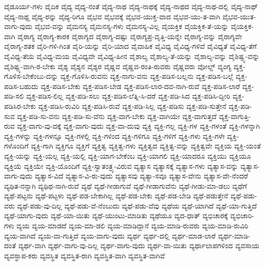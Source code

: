 {ವೈಡೂರ್ಯ-ಗಳು
ವೈದಿಕ
ವೈದ್ಯ
ವೈದ್ಯ-ನಂತೆ
ವೈದ್ಯ-ನಾಥ
ವೈದ್ಯ-ನಾಥಕ್ಕೆ
ವೈದ್ಯ-ನಾಥದ
ವೈದ್ಯ-ನಾಥ-ದಲ್ಲಿ
ವೈದ್ಯ-ನಾಥ್
ವೈದ್ಯ-ನಾಥ್ದ
ವೈದ್ಯ-ರನ್ನು
ವೈದ್ಯ-ರಿಗೂ
ವೈಭವ
ವೈಭವಕ್ಕೆ
ವೈಭವ-ಯುಕ್ತ-ವಾದ
ವೈಭವ-ಯು-ತ-ವಾಗಿ
ವೈಭವ-ಯುತ-ವಾಗು-ವುದು
ವೈಭವ-ವನ್ನು
ವೈಮನಸ್ಯ
ವೈಮನಸ್ಯ-ಗಳು
ವೈಮನಸ್ಯ-ವಿಲ್ಲ
ವೈಯಕ್ತಿಕ
ವೈಯಕ್ತಿಕ-ತೆ-ಯನ್ನು
ವೈಯಕ್ತಿಕ-ವಾಗಿ
ವೈರಾಗ್ಯ
ವೈರಾಗ್ಯ-ಕಾರಕ
ವೈರಾಗ್ಯದ
ವೈರಾಗ್ಯ-ದಷ್ಟು
ವೈರಾಗ್ಯಪ್ರ-ವೃತ್ತಿ-ಯನ್ನೇ
ವೈರಾಗ್ಯ-ವನ್ನು
ವೈರಾಗ್ಯವೇ
ವೈರಾಗ್ಯ-ಶತಕ
ವೈರಿ-ಗಳಿ-ಗಿಂತ
ವೈರಿ-ಯನ್ನು
ವೈರಿ-ಯಾದ
ವೈವಾಹಿಕ
ವೈವಿಧ್ಯ
ವೈವಿಧ್ಯ-ಗಳಿವೆ
ವೈವಿಧ್ಯತೆ
ವೈವಿಧ್ಯ-ತೆಗೆ
ವೈವಿಧ್ಯ-ತೆಯ
ವೈವಿಧ್ಯ-ಮಯ
ವೈವಿಧ್ಯವೇ
ವೈವಿಧ್ಯ-ಹೀನ
ವೈಶಾಲ್ಯ
ವೈಶಾಲ್ಯ-ತೆ-ಯನ್ನು
ವೈಶಾಲ್ಯ-ವನ್ನು
ವೈಶಿಷ್ಟ್ಯ-ವನ್ನು
ವೈಶಿಷ್ಟ್ಯ-ವಾಗಿ-ರ-ಬೇಕು
ವೈಶ್ಯ
ವೈಶ್ಯನ
ವೈಶ್ಯರ
ವೈಷ್ಣವ
ವೈಷ್ಣವ-ರಂತಿ-ರುವರು
ವೈಷ್ಣವರು
ವೋಲ್ಡ್
ವ್ಯಂಗ್ಯ
ವ್ಯಕ್ತ-ಗೊಳಿಸ-ಬೇಕೆಂಬು-ದನ್ನು
ವ್ಯಕ್ತ-ಗೊಳಿಸಿ-ರುವನು
ವ್ಯಕ್ತ-ನಾಗು-ವನು
ವ್ಯಕ್ತ-ಪಡಿಸ-ಬಲ್ಲನು
ವ್ಯಕ್ತ-ಪಡಿಸ-ಬಲ್ಲೆ
ವ್ಯಕ್ತ-ಪಡಿಸ-ಬಹುದು
ವ್ಯಕ್ತ-ಪಡಿಸ-ಬೇಕು
ವ್ಯಕ್ತ-ಪಡಿಸ-ಬೇಡ
ವ್ಯಕ್ತ-ಪಡಿಸ-ಲಾರ-ದವ-ನಾಗಿ-ರುವೆ
ವ್ಯಕ್ತ-ಪಡಿಸ-ಲಾರೆ
ವ್ಯಕ್ತ-ಪಡಿ-ಸಲಿ
ವ್ಯಕ್ತ-ಪಡಿಸ-ಲಿಲ್ಲ
ವ್ಯಕ್ತ-ಪಡಿ-ಸಲು
ವ್ಯಕ್ತ-ಪಡಿಸ-ಲೆತ್ನಿ-ಸಿ-ದರೆ
ವ್ಯಕ್ತ-ಪಡಿ-ಸಿದ
ವ್ಯಕ್ತ-ಪಡಿಸಿ-ದ್ದೀರಿ
ವ್ಯಕ್ತ-ಪಡಿಸಿರ-ಬೇಕು
ವ್ಯಕ್ತ-ಪಡಿಸಿ-ರುವಿರಿ
ವ್ಯಕ್ತ-ಪಡಿಸಿ-ರುವೆ
ವ್ಯಕ್ತ-ಪಡಿ-ಸಿಲ್ಲ
ವ್ಯಕ್ತ-ಪಡಿಸು
ವ್ಯಕ್ತ-ಪಡಿ-ಸುತ್ತೇನೆ
ವ್ಯಕ್ತ-ಪಡಿ-ಸುವ
ವ್ಯಕ್ತ-ಪಡಿ-ಸು-ವನು
ವ್ಯಕ್ತ-ಪಡಿ-ಸು-ವೆನು
ವ್ಯಕ್ತ-ವಾಗ-ಬೇಕು
ವ್ಯಕ್ತ-ವಾಗಿಯೇ
ವ್ಯಕ್ತ-ವಾಗುತ್ತದೆ
ವ್ಯಕ್ತ-ವಾಗುತ್ತಿ-ರುವ
ವ್ಯಕ್ತ-ವಾಗು-ವು-ದಕ್ಕೆ
ವ್ಯಕ್ತ-ವಾಗು-ವುದು
ವ್ಯಕ್ತ-ವಾ-ದುವು
ವ್ಯಕ್ತಿ
ವ್ಯಕ್ತಿ-ಗಲ್ಲ
ವ್ಯಕ್ತಿ-ಗಳ
ವ್ಯಕ್ತಿ-ಗಳಂತೆ
ವ್ಯಕ್ತಿ-ಗಳನ್ನಾಗಿ
ವ್ಯಕ್ತಿ-ಗಳನ್ನು
ವ್ಯಕ್ತಿ-ಗಳನ್ನೂ
ವ್ಯಕ್ತಿ-ಗಳಲ್ಲಿ
ವ್ಯಕ್ತಿ-ಗಳಿಂದ
ವ್ಯಕ್ತಿ-ಗಳಿಗೂ
ವ್ಯಕ್ತಿ-ಗಳಿಗೆ
ವ್ಯಕ್ತಿ-ಗಳು
ವ್ಯಕ್ತಿ-ಗಳೇ
ವ್ಯಕ್ತಿ-ಗಳೊಂದಿಗೆ
ವ್ಯಕ್ತಿ-ಗಾಗಿ
ವ್ಯಕ್ತಿಗೂ
ವ್ಯಕ್ತಿಗೆ
ವ್ಯಕ್ತಿತ್ವ
ವ್ಯಕ್ತಿತ್ವ-ಗಳು
ವ್ಯಕ್ತಿತ್ವದ
ವ್ಯಕ್ತಿತ್ವ-ವನ್ನು
ವ್ಯಕ್ತಿತ್ವವೇ
ವ್ಯಕ್ತಿಯ
ವ್ಯಕ್ತಿ-ಯಂತೆ
ವ್ಯಕ್ತಿ-ಯನ್ನು
ವ್ಯಕ್ತಿ-ಯಲ್ಲ
ವ್ಯಕ್ತಿ-ಯಲ್ಲಿ
ವ್ಯಕ್ತಿ-ಯಾಗ-ಬೇಕೆಂಬ
ವ್ಯಕ್ತಿ-ಯಾಗಲಿ
ವ್ಯಕ್ತಿ-ಯಾದರೂ
ವ್ಯಕ್ತಿಯು
ವ್ಯಕ್ತಿಯೂ
ವ್ಯಕ್ತಿಯೆ
ವ್ಯಕ್ತಿಯೇ
ವ್ಯಕ್ತಿ-ಯೊಂದಿಗೆ
ವ್ಯಕ್ತಿ-ಸ್ವಾತಂತ್ರ್ಯ-ವಿರುವ
ವ್ಯತ್ಯಾಸ
ವ್ಯತ್ಯಾಸಕ್ಕೆ
ವ್ಯತ್ಯಾಸ-ಗಳು
ವ್ಯತ್ಯಾಸ-ವನ್ನು
ವ್ಯತ್ಯಾಸ-ವಾಗು-ವುದು
ವ್ಯತ್ಯಾಸ-ವಿದೆ
ವ್ಯತ್ಯಾಸ-ವಿ-ರು-ವುದು
ವ್ಯತ್ಯಾಸವು
ವ್ಯತ್ಯಾ-ಸವೂ
ವ್ಯತ್ಯಾಸ-ವೇನು
ವ್ಯತ್ಯಾಸ-ವೇ-ನೆಂದರೆ
ವ್ಯಥಿತ-ನನ್ನಾಗಿ
ವ್ಯಥಿಥ-ನಾಗಿ-ರುವೆ
ವ್ಯಥೆ
ವ್ಯಥೆ-ಗೀಡಾಗುವೆ
ವ್ಯಥೆ-ಗೀಡಾಗುವೆನು
ವ್ಯಥೆ-ಗೀಡು-ಮಾ-ಡಲು
ವ್ಯಥೆಗೆ
ವ್ಯಥೆ-ಪಟ್ಟನು
ವ್ಯಥೆ-ಪಟ್ಟಳು
ವ್ಯಥೆ-ಪಡ-ಬೇಕಾಗಿಲ್ಲ
ವ್ಯಥೆ-ಪಡ-ಬೇಕು
ವ್ಯಥೆ-ಪಡ-ಬೇಡಿ
ವ್ಯಥೆ-ಪಡುತ್ತೇನೆ
ವ್ಯಥೆ-ಪಡು-ವರು
ವ್ಯಥೆ-ಪಡು-ವು-ದಿಲ್ಲ
ವ್ಯಥೆ-ಪಡು-ವೆ-ನೆಂಬುದು
ವ್ಯಥೆ-ಪಡು-ವೆವು
ವ್ಯಥೆಯ
ವ್ಯಥೆ-ಯಾಗಿದೆ
ವ್ಯಥೆ-ಯಾ-ಗುತ್ತಿದೆ
ವ್ಯಥೆ-ಯಾಗು-ವುದು
ವ್ಯಥೆ-ಯಾ-ಯಿತು
ವ್ಯಥೆ-ಯುಂಟು-ಮಾಡಿತು
ವ್ಯಥೆಯೂ
ವ್ಯದ-ಧಾತ್
ವ್ಯಭಿಚಾರಕ್ಕೆ
ವ್ಯಭಿಚಾರಿ-ಗಳು
ವ್ಯಯ
ವ್ಯಯ-ಮಾಡದೆ
ವ್ಯಯ-ಮಾ-ಡಲಿ
ವ್ಯಯ-ಮಾಡಿದ್ದಾನೆ
ವ್ಯಯ-ಮಾಡಿ-ರುವರು
ವ್ಯಯ-ಮಾಡಿ-ರುವಿರಿ
ವ್ಯಯ-ವಾಗಿದೆ
ವ್ಯಯ-ವಾ-ಗುತ್ತಿದೆ
ವ್ಯಯ-ವಾಗು-ವುದು
ವ್ಯರ್ಥ
ವ್ಯರ್ಥ-ದಲ್ಲಿ
ವ್ಯರ್ಥ-ಮಾಡ-ಲಾರೆ
ವ್ಯರ್ಥ-ಮಾಡಿ-ದಂತೆ
ವ್ಯರ್ಥ-ವಾಗಿ
ವ್ಯರ್ಥ-ವಾಗು-ವು-ದಿಲ್ಲ
ವ್ಯರ್ಥ-ವಾಗು-ವುದು
ವ್ಯರ್ಥ-ವಾ-ಯಿತು
ವ್ಯರ್ಥಾಲಾಪಗಳಿಂದ
ವ್ಯವಸಾಯ
ವ್ಯವಸ್ಥಾಪ-ಕರು
ವ್ಯವಸ್ಥಿತ
ವ್ಯವಸ್ಥಿತ-ರಾಗಿ
ವ್ಯವಸ್ಥಿತ-ವಾಗಿ
ವ್ಯವಸ್ಥಿತ-ವಾಗಿವೆ
}

